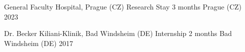 
\begin{cvmentoring}

  \cvhonor
    {General Faculty Hospital, Prague (CZ)} %
    {Research Stay 3 months} %
    {Prague (CZ)} %
    {2023} %


  \cvhonor
    {Dr. Becker Kiliani-Klinik, Bad Windsheim (DE)} %
    {Internship 2 months} %
    {Bad Windsheim (DE)} %
    {2017} %


\end{cvmentoring}